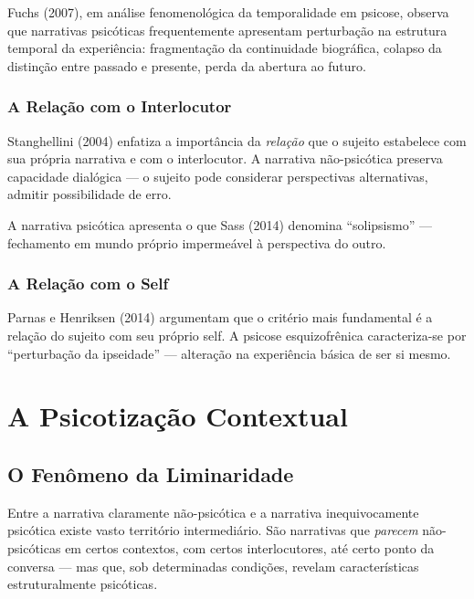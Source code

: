Fuchs (2007), em análise fenomenológica da temporalidade em psicose, observa que narrativas psicóticas frequentemente apresentam perturbação na estrutura temporal da experiência: fragmentação da continuidade biográfica, colapso da distinção entre passado e presente, perda da abertura ao futuro.

\subsubsection{A Relação com o Interlocutor}

Stanghellini (2004) enfatiza a importância da \textit{relação} que o sujeito estabelece com sua própria narrativa e com o interlocutor. A narrativa não-psicótica preserva capacidade dialógica --- o sujeito pode considerar perspectivas alternativas, admitir possibilidade de erro.

A narrativa psicótica apresenta o que Sass (2014) denomina \enquote{solipsismo} --- fechamento em mundo próprio impermeável à perspectiva do outro.

\subsubsection{A Relação com o Self}

Parnas e Henriksen (2014) argumentam que o critério mais fundamental é a relação do sujeito com seu próprio self. A psicose esquizofrênica caracteriza-se por \enquote{perturbação da ipseidade} --- alteração na experiência básica de ser si mesmo.

\section{A Psicotização Contextual}
\label{sec:psicotizacao}

\subsection{O Fenômeno da Liminaridade}

Entre a narrativa claramente não-psicótica e a narrativa inequivocamente psicótica existe vasto território intermediário. São narrativas que \textit{parecem} não-psicóticas em certos contextos, com certos interlocutores, até certo ponto da conversa --- mas que, sob determinadas condições, revelam características estruturalmente psicóticas.

